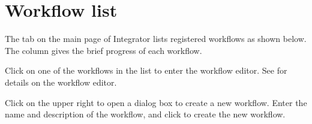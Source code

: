 \documentclass[letterpaper,10pt,english]{sphinxmanual}
\begin{document}
\chapter{Workflow list}
\label{\detokenize{integrator/part02/index:workflow-list}}\label{\detokenize{integrator/part02/index:id1}}\label{\detokenize{integrator/part02/index::doc}}
The  tab on the main page of Integrator lists registered workflows as shown below. The  column gives the brief progress of each workflow.
\begin{quote}

\begin{figure}[H]
\centering

\noindent{}
\end{figure}
\end{quote}

Click on one of the workflows in the list to enter the workflow editor. See {\hyperref[\detokenize{integrator/part03/index:workflow-editor}]{}} for details on the workflow editor.

Click  on the upper right to open a dialog box to create a new workflow. Enter the name and description of the workflow, and click  to create the new workflow.
\begin{quote}

\begin{figure}[H]
\centering

\noindent{}
\end{figure}
\end{quote}
\end{document}
